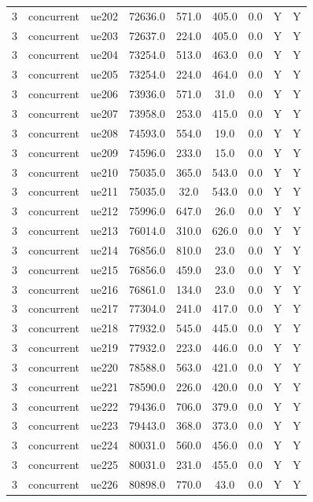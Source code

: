 \begin{table}[ht]
\begin{tabular}{|c|c|c|c|c|c|c|c|c|}
3 & concurrent & ue202 & 72636.0 & 571.0 & 405.0 & 0.0 & Y & Y \\
3 & concurrent & ue203 & 72637.0 & 224.0 & 405.0 & 0.0 & Y & Y \\
3 & concurrent & ue204 & 73254.0 & 513.0 & 463.0 & 0.0 & Y & Y \\
3 & concurrent & ue205 & 73254.0 & 224.0 & 464.0 & 0.0 & Y & Y \\
3 & concurrent & ue206 & 73936.0 & 571.0 & 31.0 & 0.0 & Y & Y \\
3 & concurrent & ue207 & 73958.0 & 253.0 & 415.0 & 0.0 & Y & Y \\
3 & concurrent & ue208 & 74593.0 & 554.0 & 19.0 & 0.0 & Y & Y \\
3 & concurrent & ue209 & 74596.0 & 233.0 & 15.0 & 0.0 & Y & Y \\
3 & concurrent & ue210 & 75035.0 & 365.0 & 543.0 & 0.0 & Y & Y \\
3 & concurrent & ue211 & 75035.0 & 32.0 & 543.0 & 0.0 & Y & Y \\
3 & concurrent & ue212 & 75996.0 & 647.0 & 26.0 & 0.0 & Y & Y \\
3 & concurrent & ue213 & 76014.0 & 310.0 & 626.0 & 0.0 & Y & Y \\
3 & concurrent & ue214 & 76856.0 & 810.0 & 23.0 & 0.0 & Y & Y \\
3 & concurrent & ue215 & 76856.0 & 459.0 & 23.0 & 0.0 & Y & Y \\
3 & concurrent & ue216 & 76861.0 & 134.0 & 23.0 & 0.0 & Y & Y \\
3 & concurrent & ue217 & 77304.0 & 241.0 & 417.0 & 0.0 & Y & Y \\
3 & concurrent & ue218 & 77932.0 & 545.0 & 445.0 & 0.0 & Y & Y \\
3 & concurrent & ue219 & 77932.0 & 223.0 & 446.0 & 0.0 & Y & Y \\
3 & concurrent & ue220 & 78588.0 & 563.0 & 421.0 & 0.0 & Y & Y \\
3 & concurrent & ue221 & 78590.0 & 226.0 & 420.0 & 0.0 & Y & Y \\
3 & concurrent & ue222 & 79436.0 & 706.0 & 379.0 & 0.0 & Y & Y \\
3 & concurrent & ue223 & 79443.0 & 368.0 & 373.0 & 0.0 & Y & Y \\
3 & concurrent & ue224 & 80031.0 & 560.0 & 456.0 & 0.0 & Y & Y \\
3 & concurrent & ue225 & 80031.0 & 231.0 & 455.0 & 0.0 & Y & Y \\
3 & concurrent & ue226 & 80898.0 & 770.0 & 43.0 & 0.0 & Y & Y \\

\end{tabular}
\end{table}
